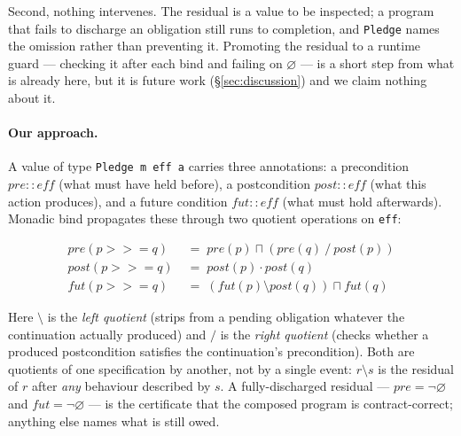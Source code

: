 \documentclass[acmsmall,screen]{acmart}
\newcommand{\pre}{\mathit{pre}}
\newcommand{\post}{\mathit{post}}
\newcommand{\fut}{\mathit{fut}}
\newcommand{\univ}{\neg\varnothing}
\newcommand{\lquot}{\mathbin{\setminus}}   %
\newcommand{\rquot}{\mathbin{/}}           %
\begin{document}
Second, nothing intervenes.
The residual is a value to be inspected; a program that fails to discharge
an obligation still runs to completion, and \lstinline{Pledge} names the
omission rather than preventing it.
Promoting the residual to a runtime guard --- checking it after each bind
and failing on $\varnothing$ --- is a short step from what is already here,
but it is future work (\S\ref{sec:discussion}) and we claim nothing about
it.

\paragraph{Our approach.}
A value of type \lstinline{Pledge m eff a} carries three annotations:
a precondition $\pre :: \mathit{eff}$ (what must have held before),
a postcondition $\post :: \mathit{eff}$ (what this action produces), and
a future condition $\fut :: \mathit{eff}$ (what must hold afterwards).
Monadic bind propagates these through two quotient operations on
\lstinline{eff}:

\begin{align}
  \pre(p \mathbin{>\!\!>\!\!=} q)  &\;=\; \pre(p) \sqcap (\pre(q) \rquot \post(p))
  \label{eq:pre-bind}  \\
  \post(p \mathbin{>\!\!>\!\!=} q) &\;=\; \post(p) \cdot \post(q)
  \label{eq:post-bind} \\
  \fut(p \mathbin{>\!\!>\!\!=} q)  &\;=\; (\fut(p) \lquot \post(q)) \sqcap \fut(q)
  \label{eq:fut-bind}
\end{align}

\noindent
Here $\lquot$ is the \emph{left quotient} (strips from a pending obligation
whatever the continuation actually produced) and $\rquot$ is the
\emph{right quotient} (checks whether a produced postcondition satisfies
the continuation's precondition).
Both are quotients of one specification by another, not by a single event:
$r \lquot s$ is the residual of $r$ after \emph{any} behaviour described by
$s$.
A fully-discharged residual --- $\pre = \univ$ and $\fut = \univ$ --- is the
certificate that the composed program is contract-correct;
anything else names what is still owed.
\end{document}
